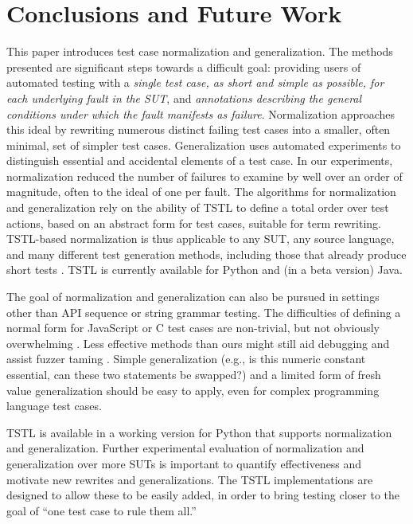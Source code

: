 \section{Conclusions and Future Work}

This paper introduces test case normalization and generalization.  The
methods presented are significant steps towards a difficult goal: providing
users of automated testing with a \emph{single test case, as short and
  simple as possible, for each underlying fault in the SUT}, and
\emph{annotations describing the general conditions under which the
  fault manifests as failure}.  Normalization approaches this ideal by
rewriting numerous distinct failing test cases into a smaller, often
minimal, set of simpler test cases.  Generalization uses
automated experiments to distinguish essential and accidental elements of
a test case.   In our experiments, normalization reduced the
number of failures to examine by well over an order of magnitude, often  to the ideal of one per fault.  The algorithms for normalization and generalization rely
on the ability of TSTL \cite{NFM15,ISSTA15} to define a total order
over test actions, based on an abstract form for test cases, suitable
for term rewriting.  TSTL-based normalization is thus applicable to
any SUT, any source language, and many different test generation methods,
including those that already produce short tests
\cite{FA11,SoftBET}.  TSTL is currently available for Python and (in a beta version) Java.


 The goal of normalization and generalization can also be pursued in
settings other than API sequence or string grammar testing.  The
difficulties of defining a normal form for JavaScript \cite{jsfunfuzz}
or C \cite{csmith} test cases are non-trivial, but not obviously
overwhelming \cite{CReduce}. Less effective methods
than ours might still aid debugging and assist fuzzer taming
\cite{PLDI13}.  Simple generalization (e.g., is this numeric constant
essential, can these two statements be swapped?) and a limited form of
fresh value generalization should be easy to apply, even for complex
programming language test cases.  

TSTL is available in a working version for Python \cite{tstl} that
supports normalization and generalization.  Further experimental
evaluation of normalization and generalization over more SUTs is
important to quantify effectiveness and motivate new rewrites and
generalizations.  The TSTL implementations are designed to allow these
to be easily added, in order to bring testing closer to the
goal of ``one test case to rule them all.''
